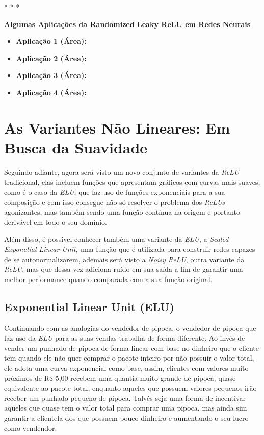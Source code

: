 \medskip
\begin{center}
 * * *
\end{center}
\medskip

\textbf{Algumas Aplicações da Randomized Leaky ReLU em Redes Neurais}
\vspace{1em}

\begin{itemize}
    \item \textbf{Aplicação 1 (Área):}
    \item \textbf{Aplicação 2 (Área):}
    \item \textbf{Aplicação 3 (Área):}
    \item \textbf{Aplicação 4 (Área):}
\end{itemize}

\section{As Variantes Não Lineares: Em Busca da Suavidade}

Seguindo adiante, agora será visto um novo conjunto de variantes da \textit{ReLU} tradicional, elas incluem funções que apresentam gráficos com curvas mais suaves, como é o caso da \textit{ELU}, que faz uso de funções exponenciais para a sua composição e com isso consegue não só resolver o problema dos \textit{ReLUs} agonizantes, mas também sendo uma função contínua na origem e portanto derivável em todo o seu domínio.

Além disso, é possível conhecer também uma variante da \textit{ELU}, a \textit{Scaled Exponetial Linear Unit}, uma função que é utilizada para construir redes capazes de se autonormalizarem, ademais será visto a \textit{Noisy ReLU}, outra variante da \textit{ReLU}, mas que dessa vez adiciona ruído em sua saída a fim de garantir uma melhor performance quando comparada com a sua função original.

\subsection{Exponential Linear Unit (ELU)}

Continuando com as analogias do vendedor de pipoca, o vendedor de pipoca que faz uso da \textit{ELU} para as suas vendas trabalha de forma diferente. Ao invés de vender um punhado de pipoca de forma linear com base no dinheiro que o cliente tem quando ele não quer comprar o pacote inteiro por não possuir o valor total, ele adota uma curva exponencial como base, assim, clientes com valores muito próximos de R\$ 5,00 recebem uma quantia muito grande de pipoca, quase equivalente ao pacote total, enquanto aqueles que possuem valores pequenos irão receber um punhado pequeno de pipoca. Talvés seja uma forma de incentivar aqueles que quase tem o valor total para comprar uma pipoca, mas ainda sim garantir a clientela dos que possuem pouco dinheiro e aumentando o seu lucro como vendendor.


